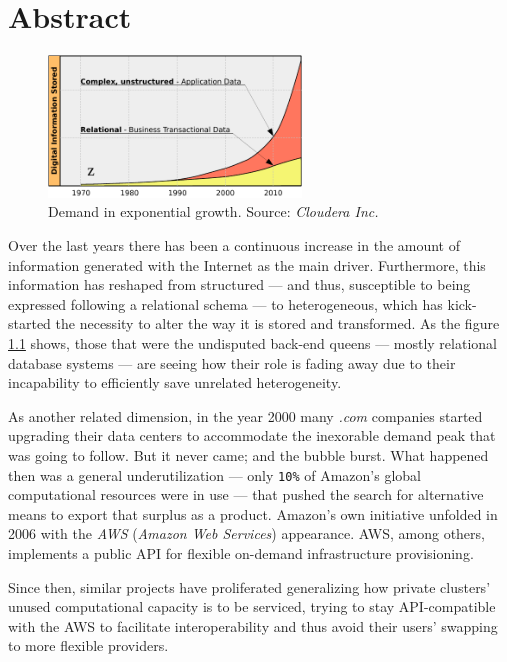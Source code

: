 \chapter{Abstract}\label{cap:intro}


\begin{figure}[tbp]
\begin{center}
\includegraphics[width=0.6\textwidth]{imagenes/001.pdf}
 \caption{Demand in exponential growth. Source: \emph{Cloudera Inc.}}
\label{fig:datagraph}
\end{center}
\end{figure}


\noindent Over the last years there has been a continuous increase in the amount of information generated with the Internet as the main driver. Furthermore, this information has reshaped from structured --- and thus, susceptible to being expressed following a relational schema --- to heterogeneous, which has kick-started the necessity to alter the way it is stored and transformed. As the figure \ref{fig:datagraph} shows, those that were the undisputed back-end queens --- mostly relational database systems --- are seeing how their role is fading away due to their incapability to efficiently save unrelated heterogeneity.

As another related dimension, in the year 2000 many \emph{.com} companies started upgrading their data centers to accommodate the inexorable demand peak that was going to follow. But it never came; and the bubble burst. What happened then was a general underutilization --- only \texttt{10\%} of Amazon's global computational resources were in use --- that pushed the search for alternative means to export that surplus as a product. Amazon's own initiative unfolded in 2006 with the \emph{AWS} (\emph{Amazon Web Services}) appearance. AWS, among others, implements a public API for flexible on-demand infrastructure provisioning.

Since then, similar projects have proliferated generalizing how private clusters' unused computational capacity is to be serviced, trying to stay API-compatible with the AWS to facilitate interoperability and thus avoid their users' swapping to more flexible providers.

